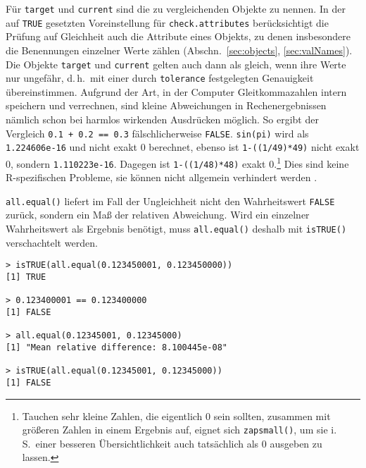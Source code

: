 Für \lstinline!target! und \lstinline!current! sind die zu vergleichenden Objekte zu nennen. In der auf \lstinline!TRUE! gesetzten Voreinstellung für \lstinline!check.attributes! berücksichtigt die Prüfung auf Gleichheit auch die Attribute eines Objekts, zu denen insbesondere die Benennungen einzelner Werte zählen (Abschn.\ \ref{sec:objects}, \ref{sec:valNames}). Die Objekte \lstinline!target! und \lstinline!current! gelten auch dann als gleich, wenn ihre Werte nur ungefähr, d.\,h.\ mit einer durch \lstinline!tolerance! festgelegten Genauigkeit übereinstimmen. Aufgrund der Art, in der Computer Gleitkommazahlen intern speichern und verrechnen, sind kleine Abweichungen in Rechenergebnissen nämlich schon bei harmlos wirkenden Ausdrücken möglich. So ergibt der Vergleich \lstinline!0.1 + 0.2 == 0.3! fälschlicherweise \lstinline!FALSE!. \lstinline!sin(pi)! wird als \lstinline!1.224606e-16! und nicht exakt $0$ berechnet, ebenso ist \lstinline!1-((1/49)*49)! nicht exakt $0$, sondern \lstinline!1.110223e-16!. Dagegen ist \lstinline!1-((1/48)*48)! exakt $0$.\footnote{Tauchen sehr kleine Zahlen, die eigentlich $0$ sein sollten, zusammen mit größeren Zahlen in einem Ergebnis auf, eignet sich \lstinline!zapsmall()!, um sie i.\,S.\ einer besseren Übersichtlichkeit auch tatsächlich als $0$ ausgeben zu lassen.} Dies sind keine R-spezifischen Probleme, sie können nicht allgemein verhindert werden \cite{Cowlishaw2008, Goldberg1991}.

\lstinline!all.equal()! liefert im Fall der Ungleichheit nicht den Wahrheitswert \lstinline!FALSE! zurück, sondern ein Maß der relativen Abweichung. Wird ein einzelner Wahrheitswert als Ergebnis benötigt, muss \lstinline!all.equal()! deshalb mit \lstinline!isTRUE()! verschachtelt werden.
\begin{lstlisting}
> isTRUE(all.equal(0.123450001, 0.123450000))
[1] TRUE

> 0.123400001 == 0.123400000
[1] FALSE

> all.equal(0.12345001, 0.12345000)
[1] "Mean relative difference: 8.100445e-08"

> isTRUE(all.equal(0.12345001, 0.12345000))
[1] FALSE
\end{lstlisting}

